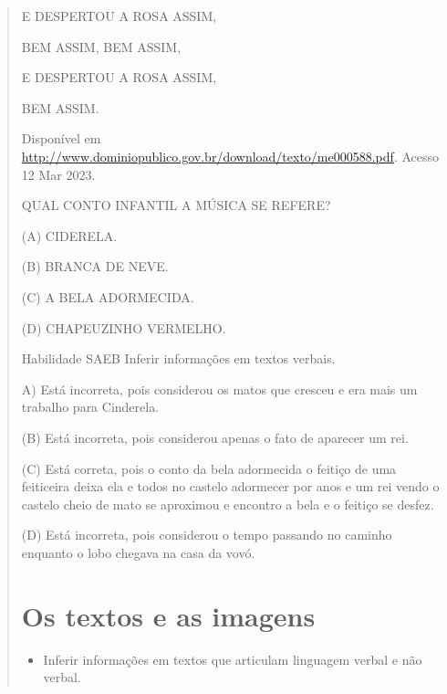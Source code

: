 {{{{\begin{verse}
{{\begin{escolha}
{{{{{E DESPERTOU A ROSA ASSIM,

BEM ASSIM, BEM ASSIM,

E DESPERTOU A ROSA ASSIM,

BEM ASSIM.

Disponível em
\url{http://www.dominiopublico.gov.br/download/texto/me000588.pdf}.
Acesso 12 Mar 2023.

QUAL CONTO INFANTIL A MÚSICA SE REFERE?

(A) CIDERELA.

(B) BRANCA DE NEVE.

(C) A BELA ADORMECIDA.

(D) CHAPEUZINHO VERMELHO.

Habilidade SAEB Inferir informações em textos verbais.

A) Está incorreta, pois considerou os matos que cresceu e era mais um
trabalho para Cinderela.

(B) Está incorreta, pois considerou apenas o fato de aparecer um rei.

(C) Está correta, pois o conto da bela adormecida o feitiço de uma
feiticeira deixa ela e todos no castelo adormecer por anos e um rei
vendo o castelo cheio de mato se aproximou e encontro a bela e o feitiço
se desfez.

(D) Está incorreta, pois considerou o tempo passando no caminho enquanto
o lobo chegava na casa da
vovó.\protect\hypertarget{_heading=h.ha8xhwafzqp2}{}{\protect\hypertarget{_heading=h.7wgwl7ctcj2x}{}{}}

\chapter{Os textos e as imagens}


\begin{itemize}
\item
Inferir informações em textos que articulam linguagem verbal e não verbal.
\end{itemize}


}}}}}
\end{escolha}}}
\end{verse}}}}}
